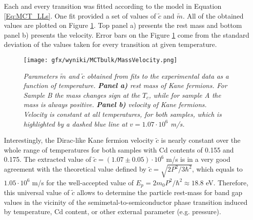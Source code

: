 \documentclass[titlepage,a4paper]{book}
\begin{document}
Each and every transition was fitted according to the model in Equation \ref{Eq:MCT_LLs}. One fit provided a set of values of $\tilde{c}$ and $\tilde{m}$. All of the obtained values are plotted on Figure \ref{fig:Bulk_MassVelocity}. Top panel a) presents the rest mass and bottom panel b) presents the velocity. Error bars on the Figure \ref{fig:Bulk_MassVelocity} come from the standard deviation of the values taken for every transition at given temperature.

\begin{figure}[H]
	\centering
	\texttt{[image: gfx/wyniki/MCTbulk/MassVelocity.png]}
	\vspace{-10pt}
	\caption{\textit{Parameters $\tilde{m}$ and $\tilde{c}$ obtained from fits to the experimental data as a function of temperature. \textbf{Panel a)} rest mass of Kane fermions. For Sample B the mass changes sign at the $T_c$, while for sample A the mass is always positive. \textbf{Panel b)} velocity of Kane fermions. Velocity is constant at all temperatures, for both samples, which is highlighted by a dashed blue line at $v = 1.07 \cdot 10^6$ m/s. }}
	\label{fig:Bulk_MassVelocity}
\end{figure}

Interestingly, the Dirac-like Kane fermion velocity $\tilde{c}$ is nearly constant over the whole range of temperatures for both samples with Cd contents of 0.155 and 0.175. The extracted value of $\tilde{c} = (1.07 \pm 0.05)\cdot 10^6$ m/s is in a very good agreement with the theoretical value defined by $\tilde{c} = \sqrt{2 P^2/3\hbar^2}$, which equals to $1.05 \cdot 10^6$ m/s for the well-accepted value of $E_p = 2m_0 P^2/ \hbar^2 \approx 18.8$ eV. Therefore, this universal value of $\tilde{c}$ allows to determine the particle rest-mass for band gap values in the vicinity of the semimetal-to-semiconductor phase transition induced by temperature, Cd content, or other external parameter (e.g. pressure).

\end{document}
